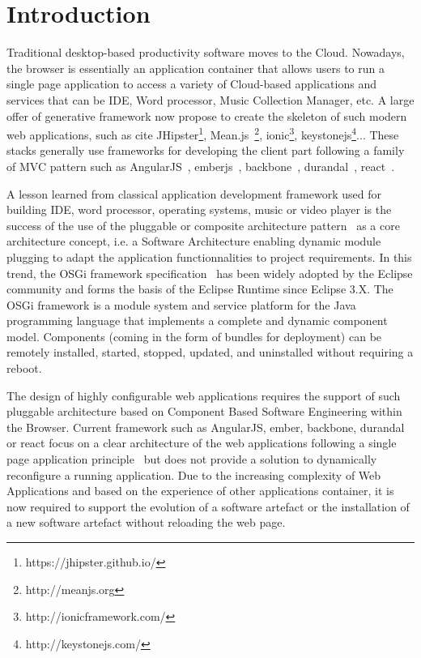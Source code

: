 \section{Introduction}

Traditional desktop-based productivity software moves to the Cloud. 
Nowadays, the browser is essentially an application container that allows users to run a single page application to  access a variety of Cloud-based applications and services that can be IDE, Word processor, Music Collection Manager, etc. 
A large offer of generative framework now propose to create the skeleton of such modern web applications, such as cite JHipster\footnote{https://jhipster.github.io/}, Mean.js~\footnote{http://meanjs.org}, ionic\footnote{http://ionicframework.com/}, keystonejs\footnote{http://keystonejs.com/}... 
These stacks generally use frameworks for developing the client part following a family of MVC pattern such as AngularJS~\cite{green2013angularjs}, emberjs~\cite{cravens2014building}, backbone~\cite{osmani2013developing}, durandal~\cite{monteiro2014learning}, react~\cite{fedosejev2015react}.  

A lesson learned from classical application development framework used for building IDE, word processor, operating systems, music or video player is the success of the use of the pluggable or composite architecture pattern~\cite{115158,schmidt2013pattern} as a core architecture concept,  i.e. a Software Architecture enabling dynamic module plugging to adapt the application functionnalities to project requirements. In this trend, the OSGi framework specification~\cite{hall2011osgi} has been widely adopted by the Eclipse community and forms the basis of the Eclipse Runtime since Eclipse 3.X. The OSGi framework is a module system and service platform for the Java programming language that implements a complete and dynamic component model. Components (coming in the form of bundles for deployment) can be remotely installed, started, stopped, updated, and uninstalled without requiring a reboot. %

The design of highly configurable web applications requires the support of such pluggable architecture based on Component Based Software Engineering within the Browser. Current framework such as AngularJS, ember, backbone, durandal or react focus on a clear architecture of the web applications following a single page application principle~\cite{monteiro2014learning} but does not provide a solution to dynamically reconfigure a running application. Due to the increasing complexity of Web Applications and based on the experience of other applications container, it is now required to support the evolution of a software artefact or the installation of a new software artefact without reloading the web page.  

